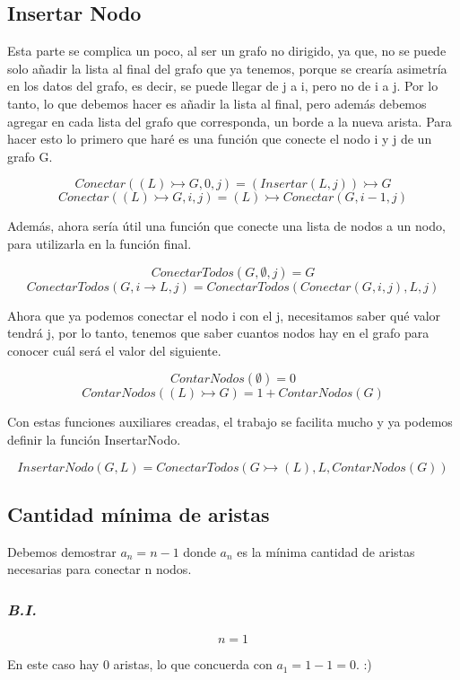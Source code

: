 \documentclass{article}
\begin{document}
\subsection{Insertar Nodo}
Esta parte se complica un poco, al ser un grafo no dirigido, ya que, no se puede
solo añadir la lista al final del grafo que ya tenemos, porque se crearía 
asimetría en los datos del grafo, es decir, se puede llegar de j a i, pero 
no de i a j.
Por lo tanto, lo que debemos hacer es añadir la lista al final, pero además 
debemos agregar en cada lista del grafo que corresponda, un borde a la nueva 
arista.
Para hacer esto lo primero que haré es una función que conecte el nodo i y j
de un grafo G.

\[ Conectar((L) \rightarrowtail G, 0, j) = (Insertar(L, j)) \rightarrowtail G \]
\[ Conectar((L) \rightarrowtail G, i, j) = (L) \rightarrowtail Conectar(G, i-1, j) \]

Además, ahora sería útil una función que conecte una lista de nodos a un nodo,
para utilizarla en la función final.

\[ ConectarTodos(G, \emptyset, j) = G  \]
\[ ConectarTodos(G, i \rightarrow L, j) = ConectarTodos(Conectar(G, i, j), L, j)  \]

Ahora que ya podemos conectar el nodo i con el j, necesitamos saber qué valor 
tendrá j, por lo tanto, tenemos que saber cuantos nodos hay en el grafo para 
conocer cuál será el valor del siguiente.

\[ ContarNodos(\emptyset) = 0 \]
\[ ContarNodos((L) \rightarrowtail G) = 1 + ContarNodos(G) \]

Con estas funciones auxiliares creadas, el trabajo se facilita mucho y ya 
podemos definir la función InsertarNodo.

\[ InsertarNodo(G, L) = ConectarTodos(G \rightarrowtail (L), L, ContarNodos(G)) \]

\subsection{Cantidad mínima de aristas}

Debemos demostrar $ a_n = n - 1 $ donde $ a_n $ es la mínima cantidad de aristas
necesarias para conectar n nodos.

\subsubsection*{\emph{B.I.}}
\[ n = 1 \]

\begin{center}
\end{center}
En este caso hay 0 aristas, lo que concuerda con $a_1 = 1 - 1 = 0$. :)
\end{document}
